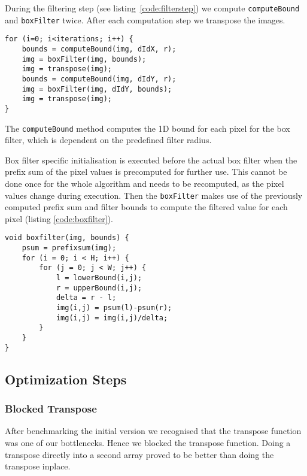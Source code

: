During the filtering step (see listing~\ref{code:filterstep}) we compute \lstinline{computeBound} and \lstinline{boxFilter} twice. After each computation step we transpose the images.

\begin{lstlisting}[caption=Filterstep,label=code:filterstep]
for (i=0; i<iterations; i++) {
    bounds = computeBound(img, dIdX, r);
    img = boxFilter(img, bounds);
    img = transpose(img);
    bounds = computeBound(img, dIdY, r);
    img = boxFilter(img, dIdY, bounds);
    img = transpose(img);
}
\end{lstlisting}

The \lstinline{computeBound} method computes the 1D bound for each pixel for the box filter, which is dependent on the predefined filter radius. 

Box filter specific initialisation is executed before the actual box filter when the prefix sum of the pixel values is precomputed for further use. This cannot be done once for the whole algorithm and needs to be recomputed, as the pixel values change during execution. Then the \lstinline{boxFilter} makes use of the previously computed prefix sum and filter bounds to compute the filtered value for each pixel (listing \ref{code:boxfilter}).

\begin{lstlisting}[caption=Boxfilter step, label=code:boxfilter]
void boxfilter(img, bounds) {
    psum = prefixsum(img);
    for (i = 0; i < H; i++) {
        for (j = 0; j < W; j++) {
            l = lowerBound(i,j);
            r = upperBound(i,j);
            delta = r - l;
            img(i,j) = psum(l)-psum(r);
            img(i,j) = img(i,j)/delta;
        }
    }
}
\end{lstlisting}

\subsection{Optimization Steps}

\subsubsection{Blocked Transpose}

After benchmarking the initial version we recognised that the transpose function was one of our bottlenecks. Hence we blocked the transpose function. Doing a transpose directly into a second array proved to be better than doing the transpose inplace.

